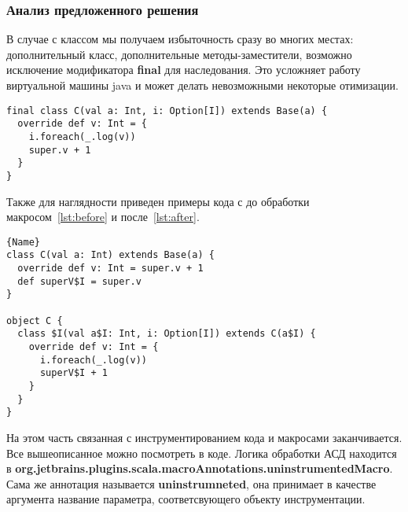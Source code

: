 \subsubsection{Анализ предложенного решения}

В случае с классом мы получаем избыточность сразу во многих местах:
дополнительный класс, дополнительные методы-заместители, возможно исключение
модификатора \textbf{final} для наследования.
Это усложняет работу виртуальной машины java и может делать невозможными
некоторые отимизации.


\begin{lstlisting}[caption={До применения макроса},label=lst:before]
final class C(val a: Int, i: Option[I]) extends Base(a) {
  override def v: Int = {
    i.foreach(_.log(v))
    super.v + 1
  }
}
\end{lstlisting}

Также для наглядности приведен примеры кода с до обработки
макросом~\ref{lst:before}
и после~\ref{lst:after}.

\begin{lstlisting}[caption={После применения макроса},label=lst:after]{Name}
class C(val a: Int) extends Base(a) {
  override def v: Int = super.v + 1
  def superV$I = super.v
}

object C {
  class $I(val a$I: Int, i: Option[I]) extends C(a$I) {
    override def v: Int = {
      i.foreach(_.log(v))
      superV$I + 1
    }
  }
}
\end{lstlisting}


На этом часть связанная с инструментированием кода и макросами заканчивается.
Все вышеописанное можно посмотреть в коде.
Логика обработки АСД находится в
\textbf{org.jetbrains.plugins.scala.macroAnnotations.uninstrumentedMacro}.
Сама же аннотация называется \textbf{uninstrumneted}, она принимает в качестве
аргумента название параметра, соответсвующего объекту инструментации.

%
%
%
%

